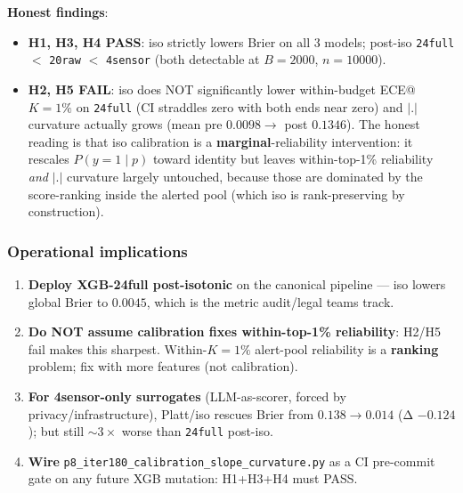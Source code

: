 \textbf{Honest findings}:
\begin{itemize}
\item \textbf{H1, H3, H4 PASS}: iso strictly lowers Brier on all 3
  models; post-iso \texttt{24full} $<$ \texttt{20raw} $<$
  \texttt{4sensor} (both detectable at $B{=}2000$, $n{=}10000$).
\item \textbf{H2, H5 FAIL}: iso does NOT significantly lower
  within-budget ECE@$K{=}1\%$ on \texttt{24full} (CI straddles zero
  with both ends near zero) and $|.|$ curvature actually grows
  (mean pre $0.0098 \to$ post $0.1346$). The honest reading is that
  iso calibration is a \textbf{marginal}-reliability intervention:
  it rescales $P(y{=}1\mid p)$ toward identity but leaves
  within-top-1\% reliability \emph{and} $|.|$ curvature largely
  untouched, because those are dominated by the score-ranking
  inside the alerted pool (which iso is rank-preserving by
  construction).
\end{itemize}

\subsubsection{Operational implications}
\begin{enumerate}
\item \textbf{Deploy XGB-24full post-isotonic} on the canonical
  pipeline — iso lowers global Brier to $0.0045$, which is the
  metric audit/legal teams track.
\item \textbf{Do NOT assume calibration fixes within-top-1\%
  reliability}: H2/H5 fail makes this sharpest. Within-$K{=}1\%$
  alert-pool reliability is a \textbf{ranking} problem; fix
  with more features (not calibration).
\item \textbf{For 4sensor-only surrogates} (LLM-as-scorer,
  forced by privacy/infrastructure), Platt/iso rescues Brier
  from $0.138 \to 0.014$ (Δ $-0.124$); but still $\sim 3\times$
  worse than \texttt{24full} post-iso.
\item \textbf{Wire} \texttt{p8\_iter180\_calibration\_slope\_curvature.py}
  as a CI pre-commit gate on any future XGB mutation: H1+H3+H4
  must PASS.
\end{enumerate}

